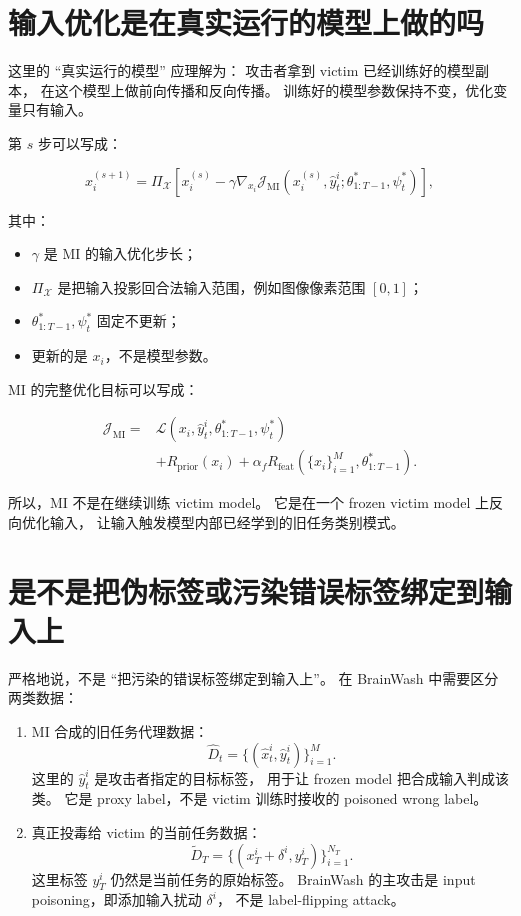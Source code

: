 \documentclass[11pt]{article}
\begin{document}
\section{输入优化是在真实运行的模型上做的吗}

这里的 ``真实运行的模型'' 应理解为：
攻击者拿到 victim 已经训练好的模型副本，
在这个模型上做前向传播和反向传播。
训练好的模型参数保持不变，优化变量只有输入。

第 \(s\) 步可以写成：

\[
x_i^{(s+1)}
=
\Pi_{\mathcal{X}}
\left[
x_i^{(s)}
-
\gamma
\nabla_{x_i}
\mathcal{J}_{\mathrm{MI}}
(x_i^{(s)},\hat{y}_t^i;
\theta_{1:T-1}^{*},\psi_t^{*})
\right],
\]

其中：

\begin{itemize}
  \item \(\gamma\) 是 MI 的输入优化步长；
  \item \(\Pi_{\mathcal{X}}\) 是把输入投影回合法输入范围，例如图像像素范围 \([0,1]\)；
  \item \(\theta_{1:T-1}^{*},\psi_t^{*}\) 固定不更新；
  \item 更新的是 \(x_i\)，不是模型参数。
\end{itemize}

MI 的完整优化目标可以写成：

\[
\begin{aligned}
\mathcal{J}_{\mathrm{MI}}
=
&
\mathcal{L}
\left(
x_i,\hat{y}_t^i,\theta_{1:T-1}^{*},\psi_t^{*}
\right) \\
&+
R_{\mathrm{prior}}(x_i)
+
\alpha_f
R_{\mathrm{feat}}(\{x_i\}_{i=1}^{M},\theta_{1:T-1}^{*}).
\end{aligned}
\]

所以，MI 不是在继续训练 victim model。
它是在一个 frozen victim model 上反向优化输入，
让输入触发模型内部已经学到的旧任务类别模式。

\section{是不是把伪标签或污染错误标签绑定到输入上}

严格地说，不是 ``把污染的错误标签绑定到输入上''。
在 BrainWash 中需要区分两类数据：

\begin{enumerate}
  \item MI 合成的旧任务代理数据：
  \[
  \hat{D}_t
  =
  \{(\hat{x}_t^i,\hat{y}_t^i)\}_{i=1}^{M}.
  \]
  这里的 \(\hat{y}_t^i\) 是攻击者指定的目标标签，
  用于让 frozen model 把合成输入判成该类。
  它是 proxy label，不是 victim 训练时接收的 poisoned wrong label。

  \item 真正投毒给 victim 的当前任务数据：
  \[
  \tilde{D}_T
  =
  \{(x_T^i+\delta^i,y_T^i)\}_{i=1}^{N_T}.
  \]
  这里标签 \(y_T^i\) 仍然是当前任务的原始标签。
  BrainWash 的主攻击是 input poisoning，即添加输入扰动 \(\delta^i\)，
  不是 label-flipping attack。
\end{enumerate}
\end{document}
